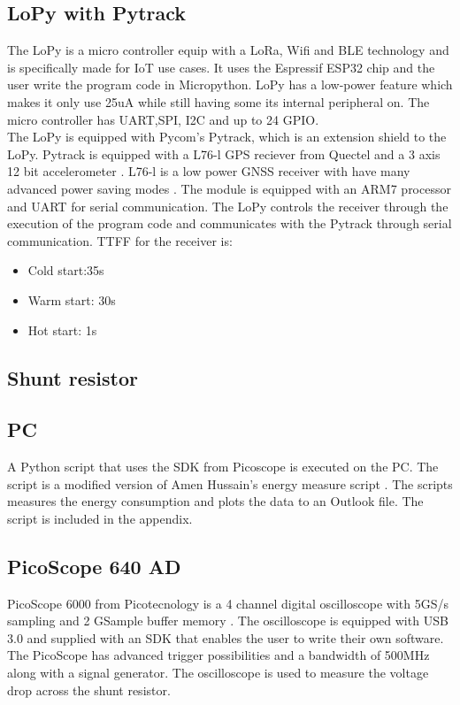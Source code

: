 \subsection{LoPy with Pytrack}
The LoPy is a micro controller equip with a LoRa, Wifi and BLE technology \cite{LoPy} and is specifically made for IoT use cases. It uses the Espressif ESP32 chip and the user write the program code in Micropython. LoPy has a low-power feature which makes it only use 25uA while still having some its internal peripheral on. The micro controller has UART,SPI, I2C and up to 24 GPIO.\\ The LoPy is equipped with Pycom's Pytrack, which is an extension shield to the LoPy. Pytrack is equipped with a L76-l GPS reciever from Quectel and a 3 axis 12 bit accelerometer \cite{Pytrack}. L76-l is a low power GNSS receiver with have many advanced power saving modes \cite{L76}. The module is equipped with an ARM7 processor and UART for serial communication. The LoPy controls the receiver through the execution of the program code and communicates with the Pytrack through serial communication. TTFF for the receiver is:
\begin{itemize}
\item Cold start:35s
\item Warm start: 30s
\item Hot start: 1s

\end{itemize}



\subsection{Shunt resistor}
\subsection{PC}
A Python script that uses the SDK from Picoscope is executed on the PC. The script is a modified version of Amen Hussain's energy measure script \cite{Amen}.  The scripts measures the energy consumption and plots the data to an Outlook file. The script is included in the appendix. 


\subsection{PicoScope 640 AD}
PicoScope 6000 from Picotecnology is a 4 channel digital oscilloscope with 5GS/s sampling and 2 GSample buffer memory \cite{Pico}. The oscilloscope is equipped with USB 3.0 and supplied with an SDK that enables the user to write their own software. The PicoScope has advanced trigger possibilities and a bandwidth of 500MHz along with a signal generator. The oscilloscope is used to measure the voltage drop across the shunt resistor.  

\newpage